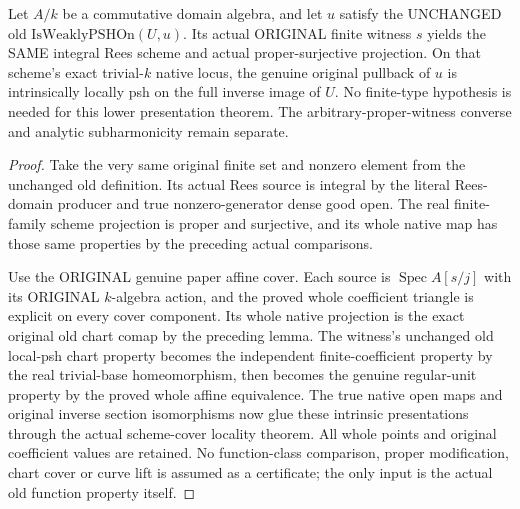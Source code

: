 \begin{theorem}
\label{paper:actual-old-weakly-psh-native-rees-witness}
\leanok
{}
Let $A/k$ be a commutative domain algebra, and let $u$ satisfy the UNCHANGED
old $\mathrm{IsWeaklyPSHOn}(U,u)$. Its actual ORIGINAL finite witness $s$
yields the SAME integral Rees scheme and actual proper-surjective projection.
On that scheme's exact trivial-$k$ native locus, the genuine original pullback
of $u$ is intrinsically locally psh on the full inverse image of $U$.
No finite-type hypothesis is needed for this lower presentation theorem.
The arbitrary-proper-witness converse and analytic subharmonicity remain separate.
\end{theorem}
\begin{proof}
Take the very same original finite set and nonzero element from the unchanged
old definition. Its actual Rees source is integral by the literal Rees-domain
producer and true nonzero-generator dense good open. The real finite-family
scheme projection is proper and surjective, and its whole native map has those
same properties by the preceding actual comparisons.

Use the ORIGINAL genuine paper affine cover. Each source is
$\operatorname{Spec}A[s/j]$ with its ORIGINAL $k$-algebra action, and the proved
whole coefficient triangle is explicit on every cover component. Its whole
native projection is the exact original old chart comap by the preceding lemma.
The witness's unchanged old local-psh chart property becomes the independent
finite-coefficient property by the real trivial-base homeomorphism, then becomes
the genuine regular-unit property by the proved whole affine equivalence.
The true native open maps and original inverse section isomorphisms now glue
these intrinsic presentations through the actual scheme-cover locality theorem.
All whole points and original coefficient values are retained. No function-class
comparison, proper modification, chart cover or curve lift is assumed as a
certificate; the only input is the actual old function property itself.
\end{proof}
